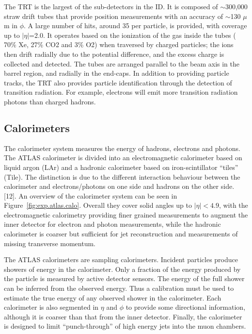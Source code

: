 The TRT is the largest of the sub-detectors in the ID.
It is composed of  $\sim$300,000 straw drift tubes 
that provide position measurements with an accuracy of $\sim$130 $\mu$m in $\phi$.
A large number of hits, around 35 per particle, is provided, with coverage up to
$|\eta|$=2.0. 
It operates based on the ionization of the gas inside the tubes ( 70\% Xe, 27\% CO2 and 3\% O2) 
when traversed by charged particles; the ions then drift radially due to
the potential difference, and the excess charge is collected and detected. 
The tubes are arranged parallel to the beam axis in the barrel region, and radially in the end-caps. 
In addition to providing particle tracks, 
the TRT also provides particle identification through
the detection of transition radiation. For example, 
electrons will emit more transition radiation photons than charged hadrons.


\subsection{Calorimeters}


The calorimeter system measures the energy of hadrons, electrons and photons.
The ATLAS calorimeter is divided into an electromagnetic calorimeter based on liquid argon (LAr)
and a hadronic calorimeter based on  iron-scintillator ``tiles'' (Tile).
The distinction is due to the
different interaction behaviour between the calorimeter and electrons/photons on one side and hadrons on the other side. 
 [12].
An overview of the calorimeter system can be seen in Figure~\ref{fig:exp.atlas.calo}. 
Overall they cover solid angles up to $|\eta| < 4.9$, with the electromagnetic calorimetry providing finer 
grained measurements to augment the inner detector for electron and photon measurements, while
the hadronic calorimeter is coarser but sufficient for jet reconstruction and measurements
of missing transverse momentum.

The ATLAS calorimeters are sampling calorimeters. 
Incident particles produce showers of energy in the calorimeter. 
Only a fraction of the energy produced by the particle is
measured by active detector sensors. 
The energy of the full shower can be inferred from the observed
energy. Thus a calibration must be used to estimate the true energy
of any observed shower in the calorimeter. Each calorimeter is also segmented in $\eta$ and
$\phi$  to provide some directional information, although it is coarser than that from
the inner detector. Finally, the calorimeter is designed to limit ``punch-through'' of high
energy jets into the muon chambers.


